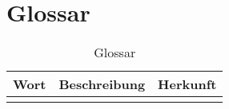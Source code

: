 \chapter{Glossar}
  \begin{longtable}{|p{3cm}|p{7cm}|p{4cm}|}
      \caption{Glossar}\\
\hline
  Wort & Beschreibung & Herkunft\\
  \hline
  & &\\
  \hline
  \end{longtable}


